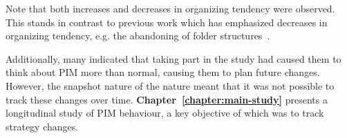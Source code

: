 Note that both increases and decreases in organizing tendency were observed. This stands in contrast to previous work which has emphasized decreases in organizing tendency, e.g. the abandoning of folder structures~\citep{ob:97}. 


Additionally, many indicated that taking part in the study had caused them to think about PIM more than normal, causing them to plan future changes.  However, the snapshot nature of the nature meant that it was not possible to track these changes over time.
\textbf{Chapter~\ref{chapter:main-study}} presents a longitudinal study of PIM behaviour, a key objective of which was to track strategy changes. 

